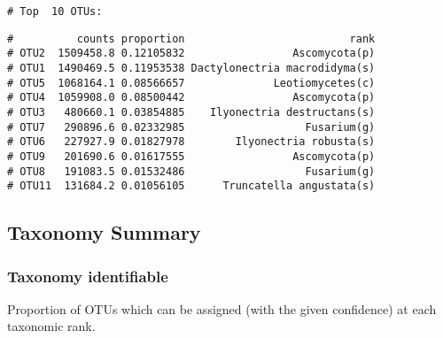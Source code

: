 \documentclass[
]{article}
\newenvironment{Shaded}{\begin{snugshade}}{\end{snugshade}}
\newcommand{\AttributeTok}[1]{\textcolor[rgb]{0.77,0.63,0.00}{#1}}
\newcommand{\DecValTok}[1]{\textcolor[rgb]{0.00,0.00,0.81}{#1}}
\newcommand{\FunctionTok}[1]{\textcolor[rgb]{0.00,0.00,0.00}{#1}}
\newcommand{\NormalTok}[1]{#1}
\newcommand{\SpecialCharTok}[1]{\textcolor[rgb]{0.00,0.00,0.00}{#1}}
\begin{document}
\begin{verbatim}
# Top  10 OTUs:
\end{verbatim}

\begin{Shaded}
\end{Shaded}

\begin{verbatim}
#          counts proportion                          rank
# OTU2  1509458.8 0.12105832                 Ascomycota(p)
# OTU1  1490469.5 0.11953538 Dactylonectria macrodidyma(s)
# OTU5  1068164.1 0.08566657              Leotiomycetes(c)
# OTU4  1059908.0 0.08500442                 Ascomycota(p)
# OTU3   480660.1 0.03854885    Ilyonectria destructans(s)
# OTU7   290896.6 0.02332985                   Fusarium(g)
# OTU6   227927.9 0.01827978        Ilyonectria robusta(s)
# OTU9   201690.6 0.01617555                 Ascomycota(p)
# OTU8   191083.5 0.01532486                   Fusarium(g)
# OTU11  131684.2 0.01056105      Truncatella angustata(s)
\end{verbatim}

\hypertarget{taxonomy-summary}{%
\subsection{Taxonomy Summary}\label{taxonomy-summary}}

\hypertarget{taxonomy-identifiable}{%
\subsubsection{Taxonomy identifiable}\label{taxonomy-identifiable}}

Proportion of OTUs which can be assigned (with the given confidence) at
each taxonomic rank.
\end{document}
